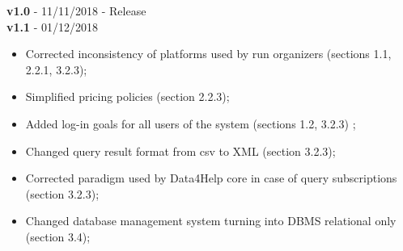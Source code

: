 \textbf{v1.0} - 11/11/2018 - Release \\
\newline
\textbf{v1.1} - 01/12/2018 \\
\begin{itemize}
    \item Corrected inconsistency of platforms used by run organizers (sections 1.1, 2.2.1, 3.2.3);
    \item Simplified pricing policies (section 2.2.3);
    \item Added log-in goals for all users of the system (sections 1.2, 3.2.3) ;
    \item Changed query result format from csv to XML (section 3.2.3);
    \item Corrected paradigm used by Data4Help core in case of query subscriptions (section 3.2.3);
    \item Changed database management system turning into DBMS relational only (section 3.4);
\end{itemize}